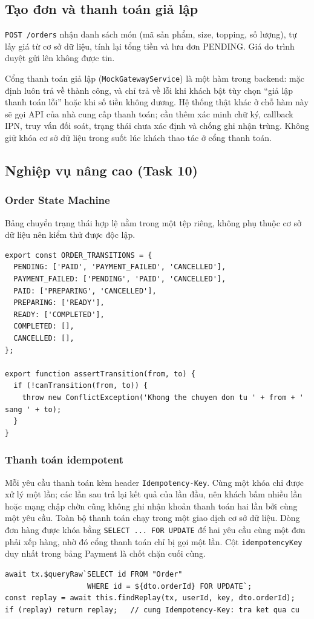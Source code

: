 \documentclass[a4paper]{article}
\begin{document}
\subsection{Tạo đơn và thanh toán giả lập}
\texttt{POST /orders} nhận danh sách món (mã sản phẩm, size, topping, số lượng), tự lấy giá từ cơ sở dữ liệu, tính lại tổng tiền và lưu đơn PENDING. Giá do trình duyệt gửi lên không được tin.

Cổng thanh toán giả lập (\texttt{MockGatewayService}) là một hàm trong backend: mặc định luôn trả về thành công, và chỉ trả về lỗi khi khách bật tùy chọn ``giả lập thanh toán lỗi'' hoặc khi số tiền không dương. Hệ thống thật khác ở chỗ hàm này sẽ gọi API của nhà cung cấp thanh toán; cần thêm xác minh chữ ký, callback IPN, truy vấn đối soát, trạng thái chưa xác định và chống ghi nhận trùng. Không giữ khóa cơ sở dữ liệu trong suốt lúc khách thao tác ở cổng thanh toán.

\subsection{Nghiệp vụ nâng cao (Task 10)}
\subsubsection{Order State Machine}
Bảng chuyển trạng thái hợp lệ nằm trong một tệp riêng, không phụ thuộc cơ sở dữ liệu nên kiểm thử được độc lập.
\begin{lstlisting}[style=brew]
export const ORDER_TRANSITIONS = {
  PENDING: ['PAID', 'PAYMENT_FAILED', 'CANCELLED'],
  PAYMENT_FAILED: ['PENDING', 'PAID', 'CANCELLED'],
  PAID: ['PREPARING', 'CANCELLED'],
  PREPARING: ['READY'],
  READY: ['COMPLETED'],
  COMPLETED: [],
  CANCELLED: [],
};

export function assertTransition(from, to) {
  if (!canTransition(from, to)) {
    throw new ConflictException('Khong the chuyen don tu ' + from + ' sang ' + to);
  }
}
\end{lstlisting}

\subsubsection{Thanh toán idempotent}
Mỗi yêu cầu thanh toán kèm header \texttt{Idempotency-Key}. Cùng một khóa chỉ được xử lý một lần; các lần sau trả lại kết quả của lần đầu, nên khách bấm nhiều lần hoặc mạng chập chờn cũng không ghi nhận khoản thanh toán hai lần bởi cùng một yêu cầu. Toàn bộ thanh toán chạy trong một giao dịch cơ sở dữ liệu. Dòng đơn hàng được khóa bằng \texttt{SELECT ... FOR UPDATE} để hai yêu cầu cùng một đơn phải xếp hàng, nhờ đó cổng thanh toán chỉ bị gọi một lần. Cột \texttt{idempotencyKey} duy nhất trong bảng Payment là chốt chặn cuối cùng.
\begin{lstlisting}[style=brew]
await tx.$queryRaw`SELECT id FROM "Order"
                   WHERE id = ${dto.orderId} FOR UPDATE`;
const replay = await this.findReplay(tx, userId, key, dto.orderId);
if (replay) return replay;   // cung Idempotency-Key: tra ket qua cu
\end{lstlisting}
\end{document}
